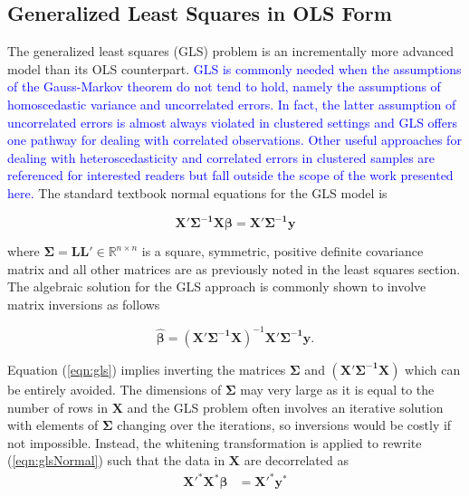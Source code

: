 \documentclass[12pt]{article}
\begin{document}
\subsection*{Generalized Least Squares in OLS Form}

The generalized least squares (GLS) problem is an incrementally more advanced model than its OLS counterpart. \textcolor{blue}{GLS is commonly needed when the assumptions of the Gauss-Markov theorem do not tend to hold, namely the assumptions of homoscedastic variance and uncorrelated errors. In fact, the latter assumption of uncorrelated errors is almost always violated in clustered settings \cite{hedges} and GLS offers one pathway for dealing with correlated observations. Other useful approaches for dealing with heteroscedasticity and correlated errors in clustered samples are referenced for interested readers \cite{bell:mccaffrey,Pustejovsky} but fall outside the scope of the work presented here.} The standard textbook normal equations for the GLS model is

\begin{equation}
\bm{X'\Sigma^{-1}X}\bm{\beta} = \bm{X'\Sigma^{-1}y}
\label{eqn:glsNormal}
\end{equation}

\noindent where $\bm{\Sigma} = \bm{LL'} \in \mathbb{R}^{n \times n}$ is a square, symmetric, positive definite covariance matrix and all other matrices are as previously noted in the least squares section. The algebraic solution for the GLS approach is commonly shown to involve matrix inversions as follows

\begin{equation}
\label{eqn:gls}
\widehat{\bm{\beta}} = \bm{(X'\Sigma^{-1}X)}^{-1} \bm{X'\Sigma^{-1}y}.
\end{equation}

Equation (\ref{eqn:gls}) implies inverting the matrices $\bm{\Sigma}$ and $\bm{(X'\Sigma^{-1}X)}$ which can be entirely avoided. The dimensions of $\bm{\Sigma}$ may very large as it is equal to the number of rows in $\bm{X}$ and the GLS problem often involves an iterative solution with elements of $\bm{\Sigma}$ changing over the iterations, so inversions would be costly if not impossible. Instead, the whitening transformation is applied to rewrite (\ref{eqn:glsNormal}) such that the data in $\bm{X}$ are decorrelated as 
\begin{align}
\bm{X'^{*}X^{*}}\bm{\beta}	&= \bm{X'^{*}y^{*}}  \label{eqn:glsNormal2}
\end{align}
\end{document}
